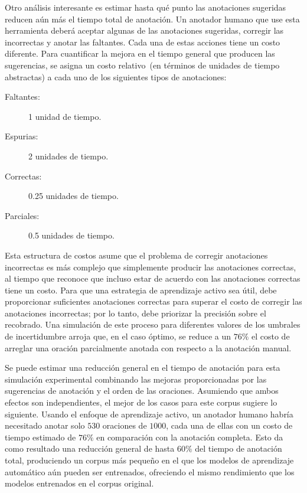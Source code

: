 Otro análisis interesante es estimar hasta qué punto las anotaciones sugeridas reducen aún más el tiempo total de anotación.
Un anotador humano que use esta herramienta deberá aceptar algunas de las anotaciones sugeridas, corregir las incorrectas y anotar las faltantes.
Cada una de estas acciones tiene un costo diferente.
Para cuantificar la mejora en el tiempo general que producen las sugerencias, se asigna un costo relativo~(en términos de unidades de tiempo abstractas) a cada uno de los siguientes tipos de anotaciones:

\begin{description}
    \item [Faltantes:] 1 unidad de tiempo.
    \item [Espurias:] 2 unidades de tiempo.
    \item [Correctas:] 0.25 unidades de tiempo.
    \item [Parciales:] 0.5 unidades de tiempo.
\end{description}

Esta estructura de costos asume que el problema de corregir anotaciones incorrectas es más complejo que simplemente producir las anotaciones correctas, al tiempo que reconoce que incluso estar de acuerdo con las anotaciones correctas tiene un costo.
Para que una estrategia de aprendizaje activo sea útil, debe proporcionar suficientes anotaciones correctas para superar el costo de corregir las anotaciones incorrectas; por lo tanto, debe priorizar la precisión sobre el recobrado.
Una simulación de este proceso para diferentes valores de los umbrales de incertidumbre arroja que, en el caso óptimo, se reduce a un $76\%$ el costo de arreglar una oración parcialmente anotada con respecto a la anotación manual.

Se puede estimar una reducción general en el tiempo de anotación para esta simulación experimental combinando las mejoras proporcionadas por las sugerencias de anotación y el orden de las oraciones.
Asumiendo que ambos efectos son independientes, el mejor de los casos para este corpus sugiere lo siguiente.
Usando el enfoque de aprendizaje activo, un anotador humano habría necesitado anotar solo $530$ oraciones de $ 1000$, cada una de ellas con un costo de tiempo estimado de $76\%$ en comparación con la anotación completa.
Esto da como resultado una reducción general de hasta $60\%$ del tiempo de anotación total, produciendo un corpus más pequeño en el que los modelos de aprendizaje automático aún pueden ser entrenados, ofreciendo el mismo rendimiento que los modelos entrenados en el corpus original.


